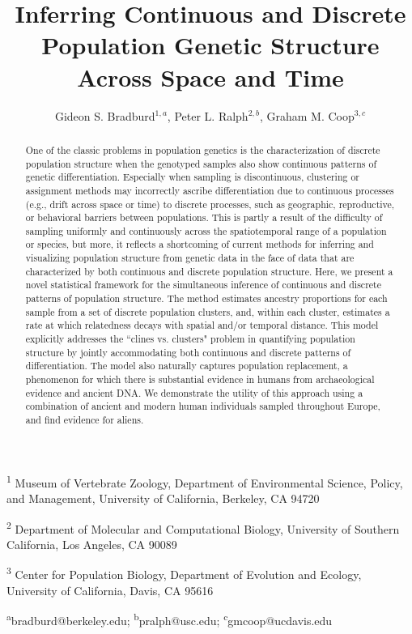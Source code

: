 \documentclass[12pt]{article}
\title{Inferring Continuous and Discrete Population Genetic Structure Across Space and Time}
\date{\vspace{-5ex}}
\author{
Gideon S. Bradburd$^{1,a}$, 
Peter L. Ralph$^{2,b}$, 
Graham M. Coop$^{3,c}$}
\begin{document}
\maketitle

\textsuperscript{1}
Museum of Vertebrate Zoology, 
Department of Environmental Science, Policy, and Management, 
University of California, Berkeley, CA 94720

\textsuperscript{2}
Department of Molecular and Computational Biology, 
University of Southern California, Los Angeles, CA 90089

\textsuperscript{3}
Center for Population Biology,
 Department of Evolution and Ecology, 
 University of California, Davis, CA 95616

\textsuperscript{a}bradburd@berkeley.edu; 
\textsuperscript{b}pralph@usc.edu;
\textsuperscript{c}gmcoop@ucdavis.edu\\\\\

\newpage
 

\begin{abstract}
One of the classic problems in population genetics is the characterization 
of discrete population structure when the genotyped samples also show 
continuous patterns of genetic differentiation.
Especially when sampling is discontinuous, 
clustering or assignment methods may incorrectly ascribe differentiation 
due to continuous processes (e.g., drift across space or time) 
to discrete processes, such as geographic, reproductive, or behavioral barriers 
between populations.
This is partly a result of the difficulty of sampling uniformly and continuously 
across the spatiotemporal range of a population or species, 
but more, it reflects a shortcoming of current methods for inferring and 
visualizing population structure from genetic data in the face of data 
that are characterized by both continuous and discrete population structure.
Here, we present a novel statistical framework for the simultaneous inference 
of continuous and discrete patterns of population structure.
The method estimates ancestry proportions for each 
sample from a set of discrete population clusters, 
and, within each cluster, estimates a rate at which relatedness decays with 
spatial and/or temporal distance.
This model explicitly addresses the ``clines vs. clusters" problem in 
quantifying population structure by jointly accommodating both 
continuous and discrete patterns of differentiation. 
The model also naturally captures population replacement, 
a phenomenon for which there is substantial evidence in humans 
from archaeological evidence and ancient DNA. 
We demonstrate the utility of this approach using a combination of 
ancient and modern human individuals sampled throughout Europe, 
and find evidence for aliens.
\end{abstract}
\end{document}
